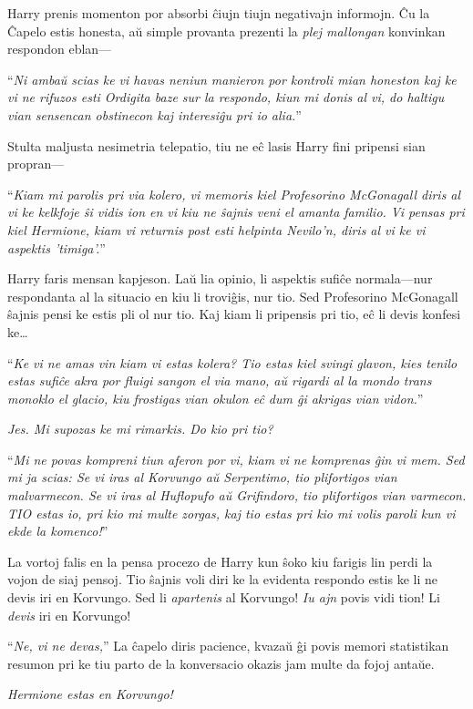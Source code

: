 Harry prenis momenton por absorbi ĉiujn tiujn negativajn informojn. Ĉu
la Ĉapelo estis honesta, aŭ simple provanta prezenti la \emph{plej
  mallongan} konvinkan respondon eblan—

``\emph{Ni ambaŭ scias ke vi havas neniun manieron por kontroli mian
  honeston kaj ke vi ne rifuzos esti Ordigita baze sur la respondo,
  kiun mi donis al vi, do haltigu vian sensencan obstinecon kaj
  interesiĝu pri io alia.}''

Stulta maljusta nesimetria telepatio, tiu ne eĉ lasis Harry fini
pripensi sian propran—

``\emph{Kiam mi parolis pri via kolero, vi memoris kiel Profesorino
  McGonagall diris al vi ke kelkfoje ŝi vidis ion en vi kiu ne ŝajnis
  veni el amanta familio. Vi pensas pri kiel Hermione, kiam vi
  returnis post esti helpinta Nevilo'n, diris al vi ke vi aspektis
  'timiga'.}''

Harry faris mensan kapjeson. Laŭ lia opinio, li aspektis sufiĉe
normala—nur respondanta al la situacio en kiu li troviĝis, nur
tio. Sed Profesorino McGonagall ŝajnis pensi ke estis pli ol nur
tio. Kaj kiam li pripensis pri tio, eĉ li devis konfesi ke\ldots

``\emph{Ke vi ne amas vin kiam vi estas kolera? Tio estas kiel svingi
  glavon, kies tenilo estas sufiĉe akra por fluigi sangon el via mano,
  aŭ rigardi al la mondo trans monoklo el glacio, kiu frostigas vian
  okulon eĉ dum ĝi akrigas vian vidon.}''

\emph{Jes. Mi supozas ke mi rimarkis. Do kio pri tio?}

``\emph{Mi ne povas kompreni tiun aferon por vi, kiam vi ne komprenas
  ĝin vi mem. Sed mi ja scias: Se vi iras al Korvungo aŭ Serpentimo,
  tio plifortigos vian malvarmecon. Se vi iras al Huflopufo aŭ
  Grifindoro, tio plifortigos vian varmecon. TIO estas io, pri kio mi
  multe zorgas, kaj tio estas pri kio mi volis paroli kun vi ekde la
  komenco!}''

La vortoj falis en la pensa procezo de Harry kun ŝoko kiu farigis lin
perdi la vojon de siaj pensoj. Tio ŝajnis voli diri ke la evidenta
respondo estis ke li ne devis iri en Korvungo.  Sed li
\emph{apartenis} al Korvungo!  \emph{Iu ajn} povis vidi tion! Li
\emph{devis} iri en Korvungo!

``\emph{Ne, vi ne devas,}'' La ĉapelo diris pacience, kvazaŭ ĝi povis
memori statistikan resumon pri ke tiu parto de la konversacio okazis
jam multe da fojoj antaŭe.

\emph{Hermione estas en Korvungo!}

